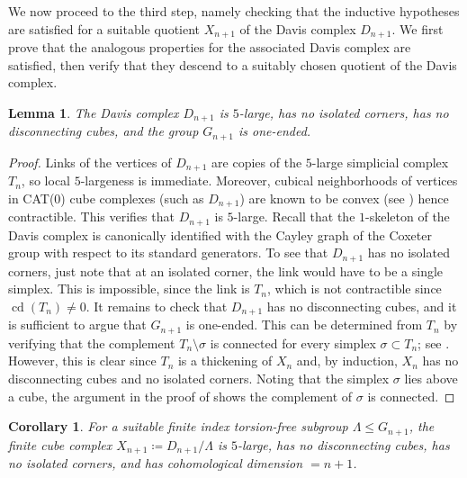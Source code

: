 \documentclass[12pt, letterpaper]{article}
\newcommand{\cdim}{\operatorname{cd}}
\theoremstyle{plain}
\newtheorem{cor}[thm]{Corollary}
\newtheorem{lem}[thm]{Lemma}
\theoremstyle{definition}
\begin{document}
We now proceed to the third step, namely checking that the inductive hypotheses are satisfied for a suitable quotient $X_{n+1}$ of the Davis complex $D_{n+1}$. We first prove that the analogous properties for the associated Davis complex are satisfied, then verify that they descend to a suitably chosen quotient of the Davis complex.

\begin{lem}\label{lem:davis-clx-inductive-step}
    The Davis complex $D_{n+1}$ is $5$-large, has no isolated corners, has no disconnecting cubes, and the group $G_{n+1}$ is one-ended.
\end{lem}

\begin{proof}
Links of the vertices of $D_{n+1}$ are copies of the $5$-large simplicial complex $T_n$, so local $5$-largeness is immediate. Moreover, cubical neighborhoods of vertices in CAT($0$) cube complexes (such as $D_{n+1}$) are known to be convex (see \cite[Lem.\ 13.15]{HaglundWise}) hence contractible. This verifies that $D_{n+1}$ is $5$-large. Recall that the $1$-skeleton of the Davis complex is canonically identified with the Cayley graph of the Coxeter group with respect to its standard generators. To see that $D_{n+1}$ has no isolated corners, just note that at an isolated corner, the link would have to be a single simplex. This is impossible, since the link is $T_n$, which is not contractible since $\cdim(T_n)\neq 0$. It remains to check that $D_{n+1}$ has no disconnecting cubes, and it is sufficient to argue that $G_{n+1}$ is one-ended. This can be determined from $T_n$ by verifying that the complement $T_n \setminus \sigma$ is connected for every simplex $\sigma \subset T_n$; see \cite[Thm.\ 8.7.2]{Davis}. However, this is clear since $T_n$ is a thickening of $X_n$ and, by induction, $X_n$ has no disconnecting cubes and no isolated corners. Noting that the simplex $\sigma$ lies above a cube, the argument in the proof of  shows the complement of $\sigma$ is connected.
\end{proof}

\begin{cor}
    For a suitable finite index torsion-free subgroup $\Lambda \leq G_{n+1}$, the finite cube complex $X_{n+1}\coloneqq D_{n+1}/\Lambda$ is $5$-large, has no disconnecting cubes, has no isolated corners, and has cohomological dimension $=n+1$.
\end{cor}
\end{document}
